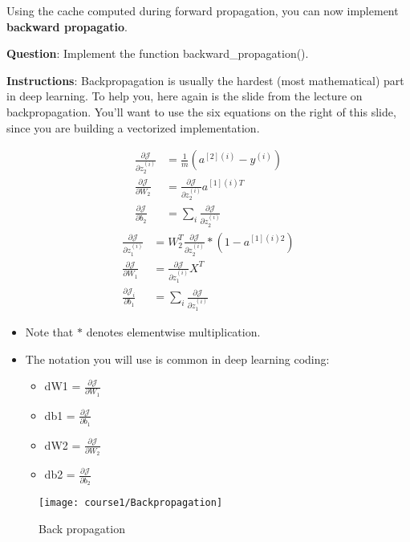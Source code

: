 Using the cache computed during forward propagation, you can now implement {\textbf {backward propagatio}}.

{\textbf {Question}}: Implement the function backward\_propagation().

{\textbf {Instructions}}: Backpropagation is usually the hardest (most mathematical) part in deep learning. To help you, here again is the slide from the lecture on backpropagation. You'll want to use the six equations on the right of this slide, since you are building a vectorized implementation.

\begin{align}
\frac{\partial \mathcal{J} }{ \partial z_{2}^{(i)} } &= \frac{1}{m} (a^{[2](i)} - y^{(i)})\\
\frac{\partial \mathcal{J} }{ \partial W_2 } &= \frac{\partial \mathcal{J} }{ \partial z_{2}^{(i)} } a^{[1] (i) T} \\
\frac{\partial \mathcal{J} }{ \partial b_2 } &= \sum_i{\frac{\partial \mathcal{J} }{ \partial z_{2}^{(i)}}}
\end{align}
\begin{align}
\frac{\partial \mathcal{J} }{ \partial z_{1}^{(i)} } &=  W_2^T \frac{\partial \mathcal{J} }{ \partial z_{2}^{(i)} } * ( 1 - a^{[1] (i) 2}) \\
\frac{\partial \mathcal{J} }{ \partial W_1 } &= \frac{\partial \mathcal{J} }{ \partial z_{1}^{(i)} }  X^T \\
\frac{\partial \mathcal{J} _i }{ \partial b_1 } &= \sum_i{\frac{\partial \mathcal{J} }{ \partial z_{1}^{(i)}}}
\end{align}

\begin{itemize}
\item Note that $*$ denotes elementwise multiplication.
\item The notation you will use is common in deep learning coding:
\begin{itemize}
\item dW1 = $\frac{\partial \mathcal{J} }{ \partial W_1 }$
\item db1 = $\frac{\partial \mathcal{J} }{ \partial b_1 }$   
\item dW2 = $\frac{\partial \mathcal{J} }{ \partial W_2 }$   
\item db2 = $\frac{\partial \mathcal{J} }{ \partial b_2 }$
\end{itemize}    
\end{itemize} 
   

\begin{figure}[h]
\begin{center}
\texttt{[image: course1/Backpropagation]}
\end{center}
\caption{Back propagation}
\label{fig:Backpropagation}
\end{figure}

